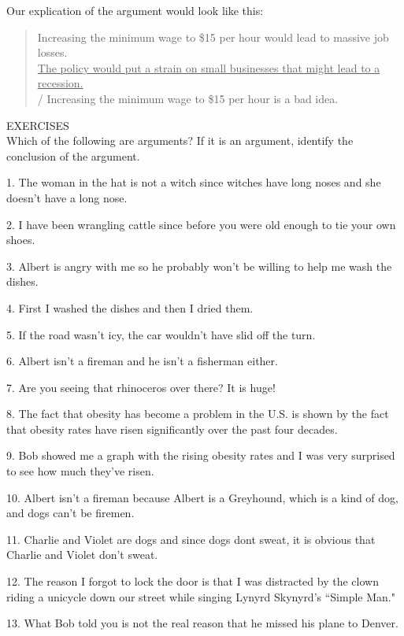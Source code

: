 Our explication of the argument would look like this:

\begin{quote}
\noindent

Increasing the minimum wage to \$15 per hour would lead to massive job losses. \\
\underline{The policy would put a strain on small businesses that might lead to a recession.} \\
/ Increasing the minimum wage to \$15 per hour is a bad idea. \\
\end{quote}

EXERCISES \\

Which of the following are arguments?           
If it is an argument,
identify the conclusion of the argument.

1. The woman in the hat is not a witch since witches have long noses and
    she doesn't have a long nose.

2. I have been wrangling cattle since before you were old enough to tie
    your own shoes.

3. Albert is angry with me so he probably won't be willing to help me wash
    the dishes.

4. First I washed the dishes and then I dried them.

5. If the road wasn't icy, the car wouldn't have slid off the turn.

6. Albert isn't a fireman and he isn't a fisherman either.

7. Are you seeing that rhinoceros over there? It is huge!

8. The fact that obesity has become a problem in the U.S. is shown by the
    fact that obesity rates have risen significantly over the past four decades.

9. Bob showed me a graph with the rising obesity rates and I was very
    surprised to see how much they've risen.

10. Albert isn't a fireman because Albert is a Greyhound, which is a kind of
    dog, and dogs can't be firemen.

11. Charlie and Violet are dogs and since dogs dont sweat, it is obvious that
    Charlie and Violet don't sweat.

12. The reason I forgot to lock the door is that I was distracted by the clown
    riding a unicycle down our street while singing Lynyrd Skynyrd's ``Simple
    Man."

13. What Bob told you is not the real reason that he missed his plane to
    Denver.

